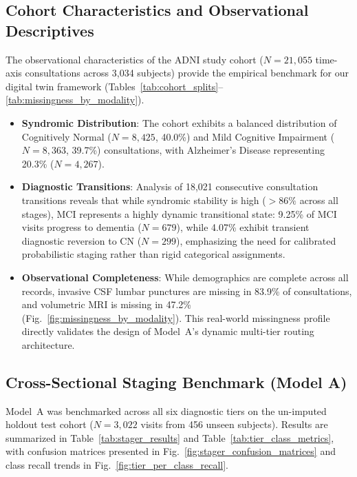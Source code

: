 \documentclass[11pt,a4paper]{article}
\begin{document}
\subsection{Cohort Characteristics and Observational Descriptives}
\label{sec:results_cohort}
The observational characteristics of the ADNI study cohort ($N = 21,055$ time-axis consultations across 3,034 subjects) provide the empirical benchmark for our digital twin framework (Tables~\ref{tab:cohort_splits}--\ref{tab:missingness_by_modality}).
\begin{itemize}
    \item \textbf{Syndromic Distribution}: The cohort exhibits a balanced distribution of Cognitively Normal ($N = 8,425$, 40.0\%) and Mild Cognitive Impairment ($N = 8,363$, 39.7\%) consultations, with Alzheimer's Disease representing 20.3\% ($N = 4,267$).
    \item \textbf{Diagnostic Transitions}: Analysis of 18,021 consecutive consultation transitions reveals that while syndromic stability is high ($> 86\%$ across all stages), MCI represents a highly dynamic transitional state: 9.25\% of MCI visits progress to dementia ($N = 679$), while 4.07\% exhibit transient diagnostic reversion to CN ($N = 299$), emphasizing the need for calibrated probabilistic staging rather than rigid categorical assignments.
    \item \textbf{Observational Completeness}: While demographics are complete across all records, invasive CSF lumbar punctures are missing in 83.9\% of consultations, and volumetric MRI is missing in 47.2\% (Fig.~\ref{fig:missingness_by_modality}). This real-world missingness profile directly validates the design of Model~A's dynamic multi-tier routing architecture.
\end{itemize}

\subsection{Cross-Sectional Staging Benchmark (Model A)}
\label{sec:results_stager}
Model~A was benchmarked across all six diagnostic tiers on the un-imputed holdout test cohort ($N = 3,022$ visits from 456 unseen subjects). Results are summarized in Table~\ref{tab:stager_results} and Table~\ref{tab:tier_class_metrics}, with confusion matrices presented in Fig.~\ref{fig:stager_confusion_matrices} and class recall trends in Fig.~\ref{fig:tier_per_class_recall}.



\end{document}
